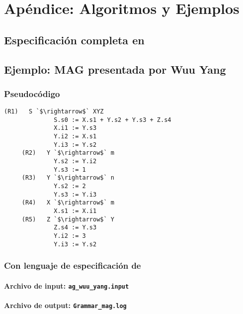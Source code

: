 \chapter{Apéndice: Algoritmos y Ejemplos}
\label{chap:appendix}

\section{Especificación completa en \spirit}
\label{append:grammarspirit}



\section{Ejemplo: MAG presentada por Wuu Yang}
\label{append:agwuuyang}

\subsection{Pseudocódigo}
\begin{lstlisting}[basicstyle=\scriptsize, backgroundcolor=\color{white}]
     (R1)   S `$\rightarrow$` XYZ      
              S.s0 := X.s1 + Y.s2 + Y.s3 + Z.s4
              X.i1 := Y.s3  
              Y.i2 := X.s1
              Y.i3 := Y.s2
     (R2)   Y `$\rightarrow$` m        
              Y.s2 := Y.i2
              Y.s3 := 1
     (R3)   Y `$\rightarrow$` n        
              Y.s2 := 2
              Y.s3 := Y.i3
     (R4)   X `$\rightarrow$` m        
              X.s1 := X.i1
     (R5)   Z `$\rightarrow$` Y        
              Z.s4 := Y.s3
              Y.i2 := 3
              Y.i3 := Y.s2
\end{lstlisting} 

\subsection{Con lenguaje de especificación de \maggen}

\subsubsection{Archivo de input: \texttt{ag\_wuu\_yang.input}}


\subsubsection{Archivo de output: \texttt{Grammar\_mag.log}}


